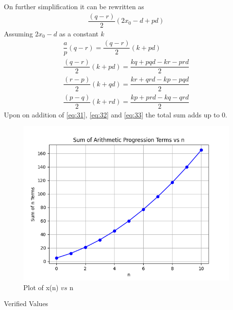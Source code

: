 \documentclass[journal,12pt,twocolumn]{IEEEtran}
\theoremstyle{remark}
\begin{document}
On further simplification it can be rewritten as 
\begin{align}
    \dfrac{(q-r)}{2}(2x_0-d+pd)
\end{align}
Assuming $2x_0-d$ as a constant $k$
\begin{align}
    \dfrac{a}{p}(q-r) = \dfrac{(q-r)}{2}(k+pd)\\
    \dfrac{(q-r)}{2}(k+pd) = \dfrac{kq+pqd-kr-prd}{2}\label{eq:31}\\
    \dfrac{(r-p)}{2}(k+qd) = \dfrac{kr+qrd-kp-pqd}{2}\label{eq:32}\\
    \dfrac{(p-q)}{2}(k+rd) = \dfrac{kp+prd-kq-qrd}{2}\label{eq:33}
\end{align}
Upon on addition of \eqref{eq:31}, \eqref{eq:32} and \eqref{eq:33} the total sum adds up to 0.
\begin{figure}[ht]
    \centering
    \includegraphics[width=\columnwidth]{figs/figure_1.png}
    \caption{Plot of x(n) $vs$ n}
    \label{fig:11.9.2.11.2}
\end{figure}
\begin{table}[ht]
    \centering
    \def\arraystretch{1.5}
    
    \caption{Verified Values}
    \label{tab:11.9.2.11.3}
\end{table}
\end{document}
